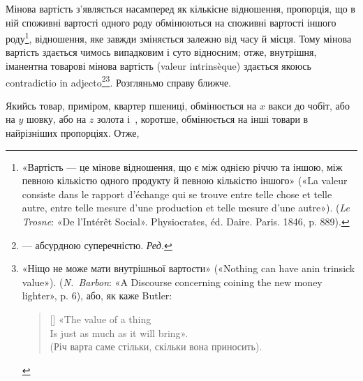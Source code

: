 Мінова вартість з’являється насамперед як кількісне відношення,
пропорція, що в ній споживні вартості одного роду обмінюються
на споживні вартості іншого роду\footnote{
«Вартість — це мінове відношення, що є між однією річчю та іншою,
між певною кількістю одного продукту й певною кількістю іншого»
(«La valeur consiste dans le rapport d’échange qui se trouve entre telle
chose et telle autre, entre telle mesure d’une production et telle mesure
d’une autre»). (\emph{Le Trosne}: «De l’Intérêt Social». Physiocrates, éd. Daire.
Paris. 1846, p. 889).
}, відношення, яке
завжди зміняється залежно від часу й місця. Тому мінова вартість
здається чимось випадковим і суто відносним; отже, внутрішня,
іманентна товарові мінова вартість (valeur intrinsèque) здається
якоюсь contradictio in adjecto\footnote*{
— абсурдною суперечністю. \emph{Ред.}
}\footnote{
«Ніщо не може мати внутрішньої вартости» («Nothing can have
anin trinsick value»). (\emph{N.~Barbon}: «A Discourse concerning coining the new
money lighter», p. 6), або, як каже Butler:
\settowidth{\versewidth}{Is just as much as it will bring».}
\begin{verse}[\versewidth]
«The value of a thing \\
Is just as much as it will bring».\\
\smallskip
(Річ варта саме стільки, скільки вона приносить).
\end{verse}
}. Розгляньмо справу ближче.

Якийсь товар, приміром, квартер пшениці, обмінюється на $x$
вакси до чобіт, або на $y$ шовку, або на $z$ золота і~, коротше,
обмінюється на інші товари в найрізніших пропорціях. Отже,
\parbreak{}  %
